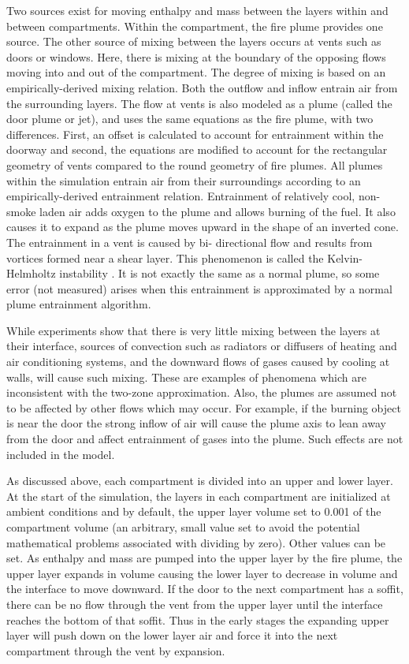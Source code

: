 Two sources exist for moving enthalpy and mass between the layers within and between
compartments.  Within the compartment, the fire plume provides one source.  The other source
of mixing between the layers occurs at vents such as doors or windows.  Here, there is mixing at
the boundary of the opposing flows moving into and out of the compartment.  The degree of
mixing is based on an empirically-derived mixing relation.  Both the outflow and inflow entrain
air from the surrounding layers.  The flow at vents is also modeled as a plume (called the door
plume or jet), and uses the same equations as the fire plume, with two differences.  First, an
offset is calculated to account for entrainment within the doorway and second, the equations are
modified to account for the rectangular geometry of vents compared to the round geometry of
fire plumes.  All plumes within the simulation entrain air from their surroundings according to
an empirically-derived entrainment relation.  Entrainment of relatively cool, non-smoke laden air
adds oxygen to the plume and allows burning of the fuel.  It also causes it to expand as the plume
moves upward in the shape of an inverted cone.  The entrainment in a vent is caused by bi-
directional flow and results from vortices formed near a shear layer.  This phenomenon is called
the Kelvin-Helmholtz instability \cite{Alterman:1961}.  It is not exactly the same as a normal plume, so some error (not measured) arises when this entrainment is approximated by a normal plume
entrainment algorithm.

While experiments show that there is very little mixing between the layers at their interface,
sources of convection such as radiators or diffusers of heating and air conditioning systems, and
the downward flows of gases caused by cooling at walls, will cause such mixing.  These are
examples of phenomena which are inconsistent with the two-zone approximation.  Also, the
plumes are assumed not to be affected by other flows which may occur.  For example, if the
burning object is near the door the strong inflow of air will cause the plume axis to lean away
from the door and affect entrainment of gases into the plume.  Such effects are not included in
the model.

As discussed above, each compartment is divided into an upper and lower layer.  At the start of
the simulation, the layers in each compartment are initialized at ambient conditions and by
default, the upper layer volume set to 0.001 of the compartment volume (an arbitrary, small
value set to avoid the potential mathematical problems associated with dividing by zero).  Other
values can be set.  As enthalpy and mass are pumped into the upper layer by the fire plume, the
upper layer expands in volume causing the lower layer to decrease in volume and the interface to
move downward.  If the door to the next compartment has a soffit, there can be no flow through
the vent from the upper layer until the interface reaches the bottom of that soffit.  Thus in the
early stages the expanding upper layer will push down on the lower layer air and force it into the
next compartment through the vent by expansion.

